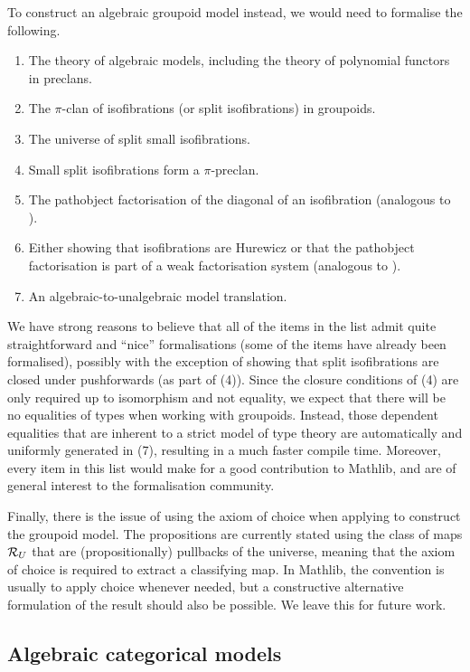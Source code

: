 To construct an algebraic groupoid model instead,
we would need to formalise the following.
\begin{enumerate}
  \item The theory of algebraic models, including the theory of polynomial functors in preclans.
  \item The $\pi$-clan of isofibrations (or split isofibrations) in groupoids.
  \item The universe of split small isofibrations.
  \item Small split isofibrations form a $\pi$-preclan.
  \item The pathobject factorisation of the diagonal of an isofibration
    (analogous to ).
  \item Either showing that isofibrations are Hurewicz
    or that the pathobject factorisation is part of a weak factorisation system
    (analogous to ).
  \item An algebraic-to-unalgebraic model translation.
\end{enumerate}

We have strong reasons to believe that all of the items
in the list admit quite straightforward and ``nice'' formalisations
(some of the items have already been formalised),
possibly with the exception of showing that
split isofibrations are closed under pushforwards (as part of (4)).
Since the closure conditions of (4) are only required up to isomorphism
and not equality, we expect that there will be no equalities of types 
when working with groupoids.
Instead, those dependent equalities that are inherent to a strict model of
type theory are automatically and uniformly generated in (7),
resulting in a much faster compile time.
Moreover, every item in this list would make for a good contribution to Mathlib,
and are of general interest to the formalisation community.

Finally, there is the issue of using the axiom of choice when applying
to construct the groupoid model.
The propositions are currently stated using the class of maps $\mathcal{R}_U$
that are (propositionally) pullbacks of the universe,
meaning that the axiom of choice is required to extract a classifying map.
In Mathlib, the convention is usually to apply choice whenever needed,
but a constructive alternative formulation of the result should also be possible.
We leave this for future work.

\subsection*{Algebraic categorical models}

